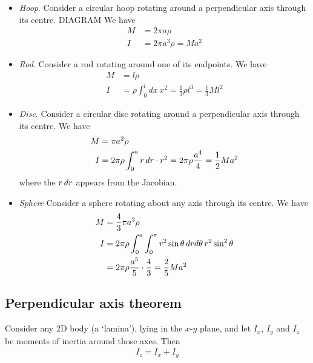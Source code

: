 \documentclass{../template/note}
\begin{document}
    \begin{example*}
        \begin{itemize}
            \item \emph{Hoop}. Consider a circular hoop rotating around a perpendicular axis through its centre. DIAGRAM We have
            \begin{align*}
                M &= 2\pi a \rho \\
                I &= 2\pi a^3 \rho = Ma^2
            \end{align*}
            \item \emph{Rod}. Consider a rod rotating around one of its endpoints. We have
            \begin{align*}
                M &= l\rho \\
                I &= \rho \int_0^l dx \, x^2 = \frac 1 3 \rho l^3 = \frac 1 3 M l^2
            \end{align*}
            \item \emph{Disc}. Consider a circular disc rotating around a perpendicular axis through its centre. We have
            \begin{align*}
                M &= \pi a^2 \rho \\
                I &= 2\pi \rho \int_0^a r \,d{r} \cdot r^2 = 2\pi \rho \frac{a^4}{4} = \frac 1 2 Ma^2
            \end{align*}
            where the \(r \,d{r}\) appears from the Jacobian.
            \item \emph{Sphere} Consider a sphere rotating about any axis through its centre. We have
            \begin{align*}
                M &= \frac 4 3 \pi a^3 \rho \\
                I &= 2 \pi \rho \int_0^a \int_0^\pi r^2 \sin \theta \,d{r} d \theta \, r^2 \sin^2 \theta \\
                &= 2\pi \rho \frac{a^5}{5} \cdot \frac 4 3 = \frac 2 5 Ma^2
            \end{align*}
        \end{itemize}
    \end{example*}
    
    \subsection{Perpendicular axis theorem}
    
    \begin{proposition}
        Consider any 2D body (a `lamina'), lying in the \(x\)-\(y\) plane, and let \(I_x\), \(I_y\) and \(I_z\) be moments of inertia around those axes. Then
        \begin{align*}
            I_z = I_x + I_y
        \end{align*}
    \end{proposition}
    
\end{document}
